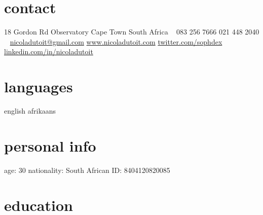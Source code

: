 \documentclass[]{friggeri-cv} %
\begin{document}


\begin{aside} %
\section{contact}
18 Gordon Rd
Observatory
Cape Town
South Africa
~
083 256 7666
021 448 2040
~
\href{mailto:nicoladutoit@gmail.com}{nicoladutoit@gmail.com}
\href{http://www.nicoladutoit.com}{www.nicoladutoit.com}
\href{https://twitter.com/sophdex}{twitter.com/sophdex}
\href{http://za.linkedin.com/in/nicoladutoit/}{linkedin.com/in/nicoladutoit}
\section{languages}
english 
afrikaans
\section{personal info}
age: 30
nationality: South African
ID: 8404120820085
\end{aside}


\section{education}
\end{document}
